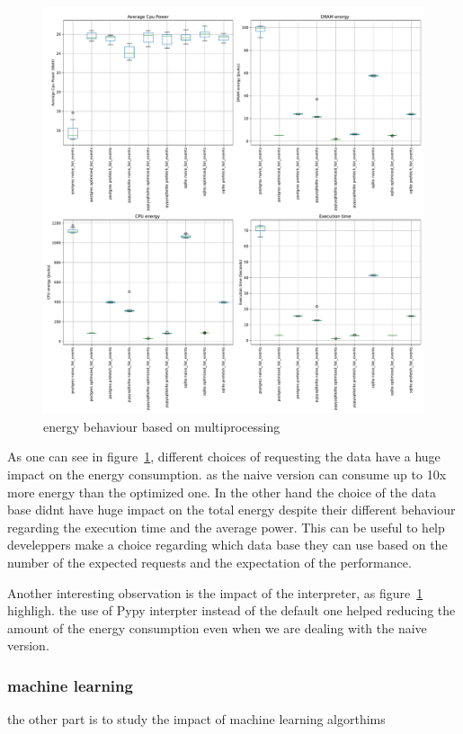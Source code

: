 \begin{figure}[!hbt]
    \centering
    \includegraphics[width=\linewidth]{imgs/django}
    \caption{energy behaviour based on multiprocessing}
    \label{fig:django}
\end{figure}



As one can see in figure~\ref{fig:django}, different choices of requesting the data have a huge impact on the energy consumption. as the naive version can consume up to 10x more energy than the optimized one.
In the other hand the choice of the data base didnt have huge impact on the total energy despite their different behaviour regarding the execution time and the average power.
This can be useful to help develeppers make a choice regarding which data base they can use based on the number of the expected requests and the expectation of the performance.

Another interesting observation is the impact of the interpreter, as figure~\ref{fig:django} highligh. the use of Pypy interpter instead of the default one helped reducing the amount of the energy consumption even when we are dealing with the naive version.


\subsubsection*{machine learning}
the other part is to study the impact of machine learning algorthims

